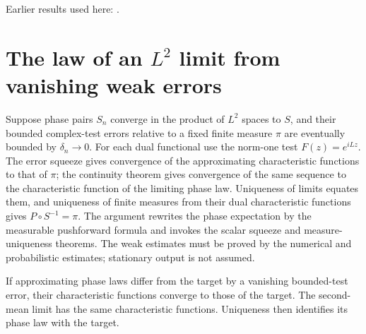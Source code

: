 \documentclass[11pt,a4paper]{article}
\begin{document}
Earlier results used here: \cite[Section~3.5.7]{LangevinLean2026ULASC}.

\section{\texorpdfstring{The law of an \(L^{2}\) limit from vanishing weak errors}{The law of an L² limit from vanishing weak errors}}


Suppose phase pairs \(S_n\) converge in the product of \(L^{2}\) spaces to \(S\), and their bounded complex-test errors relative to a fixed finite measure \(\pi\) are eventually bounded by \(\delta_n\to0\). For each dual functional use the norm-one test \(F(z)=e^{iLz}\). The error squeeze gives convergence of the approximating characteristic functions to that of \(\pi\); the continuity theorem gives convergence of the same sequence to the characteristic function of the limiting phase law. Uniqueness of limits equates them, and uniqueness of finite measures from their dual characteristic functions gives \(P\circ S^{-1}=\pi\). The argument rewrites the phase expectation by the measurable pushforward formula and invokes the scalar squeeze and measure-uniqueness theorems. The weak estimates must be proved by the numerical and probabilistic estimates; stationary output is not assumed.



If approximating phase laws differ from the target by a vanishing bounded-test error, their characteristic functions converge to those of the target. The second-mean limit has the same characteristic functions. Uniqueness then identifies its phase law with the target.
\end{document}
